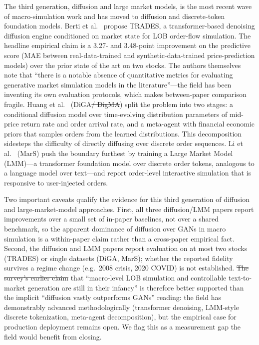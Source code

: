 \documentclass[11pt,a4paper]{article}
\makeatletter
\providecommand{\DIFaddtex}[1]{{\protect\color{blue}\uwave{#1}}} %
\providecommand{\DIFdeltex}[1]{{\protect\color{red}\sout{#1}}} %
\providecommand{\DIFaddbegin}{} %
\providecommand{\DIFaddend}{} %
\providecommand{\DIFdelbegin}{} %
\providecommand{\DIFdelend}{} %
\providecommand{\DIFadd}[1]{\texorpdfstring{\DIFaddtex{#1}}{#1}} %
\providecommand{\DIFdel}[1]{\texorpdfstring{\DIFdeltex{#1}}{}} %
\providecommand{\DIFscaledelfig}{0.5}
\newlength{\DIFdelgraphicswidth} %
\newlength{\DIFdelgraphicsheight} %
\providecommand{\DIFaddincludegraphics}[2][]{{\color{blue}\fbox{\DIFOincludegraphics[#1]{#2}}}} %
\providecommand{\DIFdelincludegraphics}[2][]{%
\sbox{\DIFdelgraphicsbox}{\DIFOincludegraphics[#1]{#2}}%
\settoboxwidth{\DIFdelgraphicswidth}{\DIFdelgraphicsbox} %
\settoboxtotalheight{\DIFdelgraphicsheight}{\DIFdelgraphicsbox} %
\scalebox{\DIFscaledelfig}{%
\parbox[b]{\DIFdelgraphicswidth}{\usebox{\DIFdelgraphicsbox}\\[-\baselineskip] \rule{\DIFdelgraphicswidth}{0em}}\llap{\resizebox{\DIFdelgraphicswidth}{\DIFdelgraphicsheight}{%
\setlength{\unitlength}{\DIFdelgraphicswidth}%
\begin{picture}(1,1)%
\thicklines\linethickness{2pt} %
{\color[rgb]{1,0,0}\put(0,0){\framebox(1,1){}}}%
{\color[rgb]{1,0,0}\put(0,0){\line( 1,1){1}}}%
{\color[rgb]{1,0,0}\put(0,1){\line(1,-1){1}}}%
\end{picture}%
}\hspace*{3pt}}} %
} %
\DeclareRobustCommand{\DIFaddbegin}{\DIFOaddbegin \let\includegraphics\DIFaddincludegraphics} %
\DeclareRobustCommand{\DIFaddend}{\DIFOaddend \let\includegraphics\DIFOincludegraphics} %
\DeclareRobustCommand{\DIFdelbegin}{\DIFOdelbegin \let\includegraphics\DIFdelincludegraphics} %
\DeclareRobustCommand{\DIFdelend}{\DIFOaddend \let\includegraphics\DIFOincludegraphics} %
\let\sout@orig\sout %
\renewcommand{\sout}[1]{\ifmmode\text{\sout@orig{\ensuremath{#1}}}\else\sout@orig{#1}\fi} %
\makeatother
\begin{document}
The third generation, diffusion and large market models, is the most recent wave of macro-simulation work and has moved to diffusion and discrete-token foundation models. Berti et al.~\citep{berti2025trades} propose TRADES, a transformer-based denoising diffusion engine conditioned on market state for LOB order-flow simulation. The headline empirical claim is a 3.27- and 3.48-point improvement on the predictive score (MAE between real-data-trained and synthetic-data-trained price-prediction models) over the prior state of the art on two stocks. The authors themselves note that ``there is a notable absence of quantitative metrics for evaluating generative market simulation models in the literature''---the field has been inventing its own evaluation protocols, which makes between-paper comparison fragile. Huang et al.~\citep{huang2024diga} (DiGA\DIFdelbegin \DIFdel{/ DigMA}\DIFdelend ) split the problem into two stages: a conditional diffusion model over time-evolving distribution parameters of mid-price return rate and order arrival rate, and a meta-agent with financial economic priors that samples orders from the learned distributions. This decomposition sidesteps the difficulty of directly diffusing over discrete order sequences. Li et al.~\citep{li2025mars} (MarS) push the boundary furthest by training a Large Market Model (LMM)---a transformer foundation model over discrete order tokens, analogous to a language model over text---and report order-level interactive simulation that is responsive to user-injected orders.

Two important caveats qualify the evidence for this third generation of diffusion and large-market-model approaches. First, all three diffusion/LMM papers report improvements over a small set of in-paper baselines, not over a shared benchmark, so the apparent dominance of diffusion over GANs in macro simulation is a within-paper claim rather than a cross-paper empirical fact. Second, the diffusion and LMM papers report evaluation on at most two stocks (TRADES) or single datasets (DiGA, MarS); whether the reported fidelity survives a regime change (e.g.\ 2008 crisis, 2020 COVID) is not established. \DIFdelbegin \DIFdel{The survey's earlier claim }\DIFdelend \DIFaddbegin \DIFadd{Our earlier statement }\DIFaddend that ``macro-level LOB simulation and controllable text-to-market generation are still in their infancy'' is therefore better supported than the implicit ``diffusion vastly outperforms GANs'' reading: the field has demonstrably advanced methodologically (transformer denoising, LMM-style discrete tokenization, meta-agent decomposition), but the empirical case for production deployment remains open. We flag this as a measurement gap the field would benefit from closing.
\end{document}
